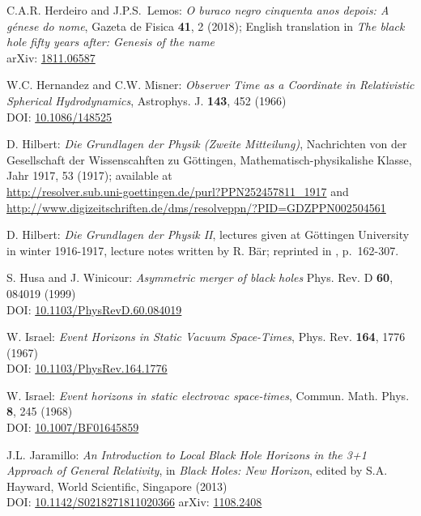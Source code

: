 \begin{thebibliography}{123}
C.A.R. Herdeiro and J.P.S.~Lemos:
\emph{O buraco negro cinquenta anos depois:
A génese do nome},
Gazeta de Fisica {\bf 41}, 2 (2018); English translation in
\emph{The black hole fifty years after: Genesis of the name}\\
arXiv: \href{https://arxiv.org/abs/1811.06587}{1811.06587}

W.C. Hernandez and C.W. Misner:
{\em Observer Time as a Coordinate in Relativistic Spherical Hydrodynamics},
Astrophys. J. {\bf 143}, 452 (1966) \\
DOI: \href{https://doi.org/10.1086/148525}{10.1086/148525}

D. Hilbert:
{\em Die Grundlagen der Physik (Zweite Mitteilung)},
Nachrichten von der Gesellschaft der Wissenscahften zu Göttingen,
Mathematisch-physikalishe Klasse, Jahr 1917, 53 (1917);
available at\\
\url{http://resolver.sub.uni-goettingen.de/purl?PPN252457811_1917} and\\
\url{http://www.digizeitschriften.de/dms/resolveppn/?PID=GDZPPN002504561}

D. Hilbert:
{\em Die Grundlagen der Physik II},
lectures given at Göttingen University in winter 1916-1917,
lecture notes written by R. Bär; reprinted
in \cite{SauerM09}, p.~162-307.

S. Husa and J. Winicour:
{\em Asymmetric merger of black holes}
Phys. Rev. D {\bf 60}, 084019 (1999)\\
DOI: \href{https://doi.org/10.1103/PhysRevD.60.084019}{10.1103/PhysRevD.60.084019}

W. Israel: {\em Event Horizons in Static Vacuum Space-Times},
Phys. Rev. {\bf 164}, 1776 (1967)\\
DOI: \href{https://doi.org/10.1103/PhysRev.164.1776}{10.1103/PhysRev.164.1776}

W. Israel: {\em Event horizons in static electrovac space-times},
Commun. Math. Phys. {\bf 8}, 245 (1968)\\
DOI: \href{https://doi.org/10.1007/BF01645859}{10.1007/BF01645859}

J.L. Jaramillo: {\em An Introduction to Local Black Hole Horizons in the 3+1
Approach of General Relativity}, in {\em Black Holes: New Horizon}, edited
by S.A. Hayward, World Scientific, Singapore (2013)\\
DOI: \href{https://doi.org/10.1142/S0218271811020366}{10.1142/S0218271811020366}\hfill
arXiv: \href{https://arxiv.org/abs/1108.2408}{1108.2408}


\end{thebibliography}
